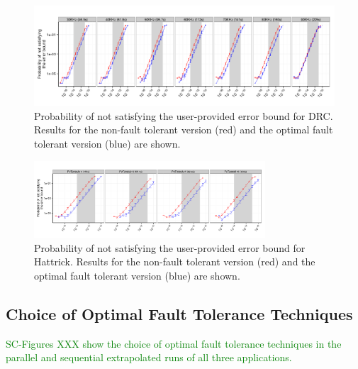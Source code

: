 \documentclass[10pt, conference, compsocconf]{IEEEtran}
\newcommand{\sui}[1]{%
  \textcolor{green}{SC-#1}
}
\begin{document}
\begin{figure}[ht!]
\centering
\includegraphics[width=7in]{figs/DRC_Par_Seq_ImperfectRate_log.png}
\vspace{-10pt}
\caption{Probability of not satisfying the user-provided error bound for DRC. Results for the non-fault tolerant version (red) and the optimal fault tolerant version (blue) are shown.}
\vspace{-10pt}
\label{fig:DRC_ImperfectRate}
\end{figure}

\begin{figure}[ht!]
\centering
\includegraphics[width=3.4in]{figs/Hattrick_Par_Seq_ImperfectRate_log.png}
\vspace{-10pt}
\caption{Probability of not satisfying the user-provided error bound for Hattrick. Results for the non-fault tolerant version (red) and the optimal fault tolerant version (blue) are shown.}
\vspace{-10pt}
\label{fig:Hattrick_ImperfectRate}
\end{figure}

\vspace{-10pt}
\subsection{Choice of Optimal Fault Tolerance Techniques}
\vspace{-10pt}
\label{sec:eval:optchoice}

\sui{Figures XXX show the choice of optimal fault tolerance techniques in the parallel and sequential extrapolated runs of all three applications.}
\end{document}
